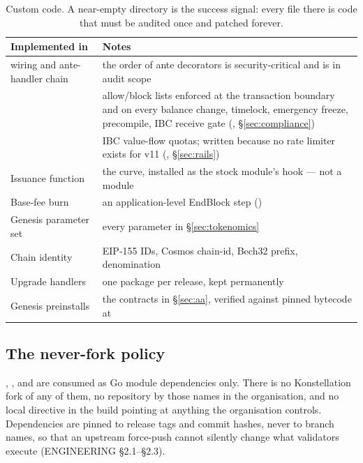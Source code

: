 \begin{table}[H]
\centering
\small
\begin{tabularx}{\textwidth}{@{}lL@{}}
\toprule
Implemented in  & Notes \\
\midrule
{} wiring and ante-handler chain & the order of ante decorators is security-critical and is in audit scope \\
 & allow/block lists enforced at the transaction boundary and on every balance change, timelock, emergency freeze, precompile, IBC receive gate (, \S\ref{sec:compliance}) \\
 & IBC value-flow quotas; written because no rate limiter exists for  v11 (, \S\ref{sec:rails}) \\
Issuance function & the  curve, installed as the stock  module's  hook --- not a module \\
Base-fee burn & an application-level EndBlock step () \\
Genesis parameter set & every parameter in \S\ref{sec:tokenomics} \\
Chain identity & EIP-155 IDs, Cosmos chain-id, Bech32 prefix, denomination \\
Upgrade handlers & one package per release, kept permanently \\
Genesis preinstalls & the contracts in \S\ref{sec:aa}, verified against pinned bytecode at  \\
\bottomrule
\end{tabularx}
\caption{Custom code. A near-empty  directory is the success signal:
every file there is code that must be audited once and patched forever.}
\label{tab:implemented}
\end{table}

\subsection{The never-fork policy}
\label{sec:neverfork}

, ,  and  are
consumed as Go module dependencies only. There is no Konstellation fork of any
of them, no repository by those names in the organisation, and no local
 directive in the build pointing at anything the organisation
controls. Dependencies are pinned to release tags and commit hashes, never to
branch names, so that an upstream force-push cannot silently change what
validators execute (ENGINEERING \S2.1--\S2.3).


